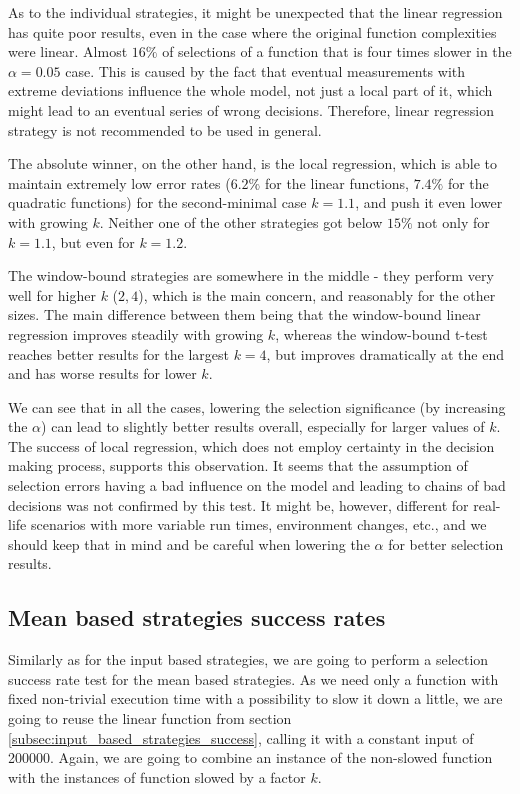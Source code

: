 As to the individual strategies, it might be unexpected that the linear regression has quite poor results, even in the case where the original function complexities were linear. Almost $16\%$ of selections of a function that is four times slower in the $\alpha = 0.05$ case. This is caused by the fact that eventual measurements with extreme deviations influence the whole model, not just a local part of it, which might lead to an eventual series of wrong decisions. Therefore, linear regression strategy is not recommended to be used in general.

The absolute winner, on the other hand, is the local regression, which is able to maintain extremely low error rates ($6.2\%$ for the linear functions, $7.4\%$ for the quadratic functions) for the second-minimal case $k=1.1$, and push it even lower with growing $k$. Neither one of the other strategies got below $15\%$ not only for $k=1.1$, but even for $k=1.2$.

The window-bound strategies are somewhere in the middle - they perform very well for higher $k$ ($2, 4$), which is the main concern, and reasonably for the other sizes. The main difference between them being that the window-bound linear regression improves steadily with growing $k$, whereas the window-bound t-test reaches better results for the largest $k=4$, but improves dramatically at the end and has worse results for lower $k$.

We can see that in all the cases, lowering the selection significance (by increasing the $\alpha$) can lead to slightly better results overall, especially for larger values of $k$. The success of local regression, which does not employ certainty in the decision making process, supports this observation. It seems that the assumption of selection errors having a bad influence on the model and leading to chains of bad decisions was not confirmed by this test. It might be, however, different for real-life scenarios with more variable run times, environment changes, etc., and we should keep that in mind and be careful when lowering the $\alpha$ for better selection results.

\subsection{Mean based strategies success rates}

Similarly as for the input based strategies, we are going to perform a selection success rate test for the mean based strategies. As we need only a function with fixed non-trivial execution time with a possibility to slow it down a little, we are going to reuse the linear function from section \ref{subsec:input_based_strategies_success}, calling it with a constant input of 200000. Again, we are going to combine an instance of the non-slowed function with the instances of function slowed by a factor $k$. 

